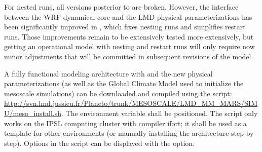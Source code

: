 For nested runs, all versions posterior to  are broken. However, the interface between the WRF dynamical core and the LMD physical parameterizations has been significantly improved in , which fixes nesting runs and simplifies restart runs. Those improvements remain to be extensively tested more extensively, but getting an operational model with nesting and restart runs will only require now minor adjustments that will be committed in subsequent revisions of the model.



\sk
A fully functional modeling architecture with  and the new physical parameterizations (as well as the  Global Climate Model used to initialize the mesoscale simulations) can be downloaded and compiled using the  script: \url{http://svn.lmd.jussieu.fr/Planeto/trunk/MESOSCALE/LMD_MM_MARS/SIMU/meso_install.sh}. The  environment variable shall be positioned. The  script only works on the IPSL  computing cluster with compiler ifort; it shall be used as a template for other environments (or manually installing the architecture step-by-step). Options in the  script can be displayed with the  option.

